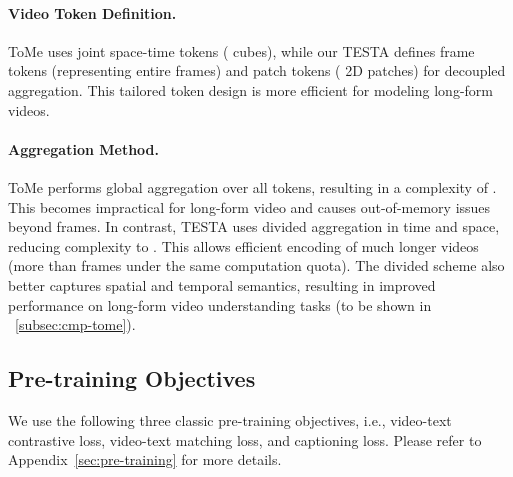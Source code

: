 \documentclass[11pt]{article}
\newcommand{\modelname}{TESTA\xspace}
\begin{document}
\paragraph{Video Token Definition.} ToMe uses joint space-time tokens ( cubes), while our \modelname defines frame tokens (representing entire frames) and patch tokens ( 2D patches) for decoupled aggregation. This tailored token design is more efficient for modeling long-form videos.

\paragraph{Aggregation Method.} ToMe performs global aggregation over all tokens, resulting in a complexity of . This becomes impractical for long-form video and causes out-of-memory issues beyond  frames. In contrast, \modelname uses divided aggregation in time and space, reducing complexity to . This allows efficient encoding of much longer videos (more than  frames under the same computation quota). The divided scheme also better captures spatial and temporal semantics, resulting in improved performance on long-form video understanding tasks (to be shown in ~\ref{subsec:cmp-tome}).

\subsection{Pre-training Objectives}
\label{subsec:obj}
We use the following three classic  pre-training objectives, i.e., video-text contrastive loss, video-text matching loss, and captioning loss. Please refer to Appendix~\ref{sec:pre-training} for more details.
\end{document}
